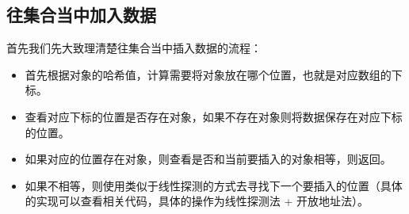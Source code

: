\subsection{往集合当中加入数据}
首先我们先大致理清楚往集合当中插入数据的流程：
\begin{itemize}
\item 首先根据对象的哈希值，计算需要将对象放在哪个位置，也就是对应数组的下标。 
\item 查看对应下标的位置是否存在对象，如果不存在对象则将数据保存在对应下标的位置。 
\item 如果对应的位置存在对象，则查看是否和当前要插入的对象相等，则返回。 
\item 如果不相等，则使用类似于线性探测的方式去寻找下一个要插入的位置（具体的实现可以查看相关代码，具体的操作为线性探测法 + 开放地址法）。 
\end{itemize}
